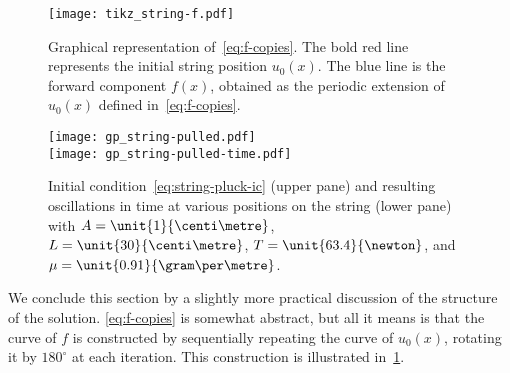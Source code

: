 \begin{figure}[t]
  \centering
  \texttt{[image: tikz\_string-f.pdf]}
  \caption{Graphical representation of~\cref{eq:f-copies}. The bold red line represents the initial string position $u_0(x)$. The blue line is the forward component $f(x)$, obtained as the periodic extension of $u_0(x)$ defined in~\cref{eq:f-copies}.}
  \label{fig:string-f}
\end{figure}
\begin{figure}[t]
  \centering
  \texttt{[image: gp\_string-pulled.pdf]}\\
  \texttt{[image: gp\_string-pulled-time.pdf]}
  \caption{Initial condition~\cref{eq:string-pluck-ic} (upper pane) and resulting oscillations in time at various positions on the string (lower pane) with $A=\unit{1}{\centi\metre}$, $L=\unit{30}{\centi\metre}$, $T=\unit{63.4}{\newton}$, and $\mu=\unit{0.91}{\gram\per\metre}$.}
  \label{fig:string-pulled}
\end{figure}
We conclude this section by a slightly more practical discussion of the structure of the solution.
\cref{eq:f-copies} is somewhat abstract, but all it means is that the curve of $f$ is constructed
by sequentially repeating the curve of $u_0(x)$, rotating it by $180^{\circ}$ at each iteration. This construction
is illustrated in~\cref{fig:string-f}.
%
